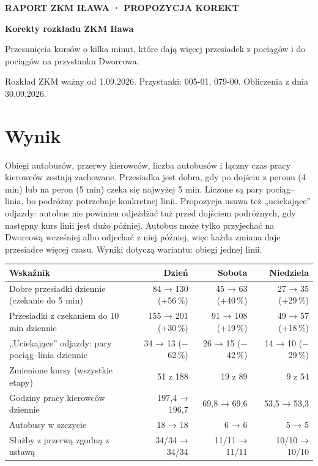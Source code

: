 \documentclass[10pt,a4paper]{article}
\newcommand{\mut}[1]{\textcolor{muted}{#1}}
\begin{document}
{\sffamily\footnotesize\bfseries\MakeUppercase{Raport ZKM Iława · propozycja korekt}}\par\smallskip
{\sffamily\LARGE\bfseries Korekty rozkładu ZKM Iława}\par\medskip
{\large Przesunięcia kursów o kilka minut, które dają więcej przesiadek z pociągów i do pociągów na przystanku Dworcowa.}\par\medskip
{\small\mut{Rozkład ZKM ważny od 1.09.2026. Przystanki: 005-01, 079-00. Obliczenia z dnia 30.09.2026.}}\par\bigskip
\section*{Wynik}
Obiegi autobusów, przerwy kierowców, liczba autobusów i łączny czas pracy kierowców zostają zachowane. Przesiadka jest dobra, gdy po dojściu z peronu (4 min) lub na peron (5 min) czeka się najwyżej 5 min. Liczone są pary pociąg--linia, bo podróżny potrzebuje konkretnej linii. Propozycja usuwa też „uciekające” odjazdy: autobus nie powinien odjeżdżać tuż przed dojściem podróżnych, gdy następny kurs linii jest dużo później. Autobus może tylko przyjechać na Dworcową wcześniej albo odjechać z niej później, więc każda zmiana daje przesiadce więcej czasu. Wyniki dotyczą wariantu: obiegi jednej linii.
{\footnotesize
\begin{center}\begin{tabular}{@{}p{5.4cm} r r r@{}}\toprule
Wskaźnik & Dzień & Sobota & Niedziela \\ \midrule
Dobre przesiadki dziennie (czekanie do 5 min) & 84 → 130 \mut{(+56\,\%)} & 45 → 63 \mut{(+40\,\%)} & 27 → 35 \mut{(+29\,\%)} \\
Przesiadki z czekaniem do 10 min dziennie & 155 → 201 \mut{(+30\,\%)} & 91 → 108 \mut{(+19\,\%)} & 49 → 57 \mut{(+18\,\%)} \\
„Uciekające” odjazdy: pary pociąg--linia dziennie & 34 → 13 \mut{($-$62\,\%)} & 26 → 15 \mut{($-$42\,\%)} & 14 → 10 \mut{($-$29\,\%)} \\
Zmienione kursy (wszystkie etapy) & 51 z 188 & 19 z 89 & 9 z 54 \\
Godziny pracy kierowców dziennie & 197,4 → 196,7 & 69,8 → 69,6 & 53,5 → 53,3 \\
Autobusy w szczycie & 18 → 18 & 6 → 6 & 5 → 5 \\
Służby z przerwą zgodną z ustawą & 34/34 → 34/34 & 11/11 → 11/11 & 10/10 → 10/10 \\
\bottomrule\end{tabular}\end{center}}
\end{document}
